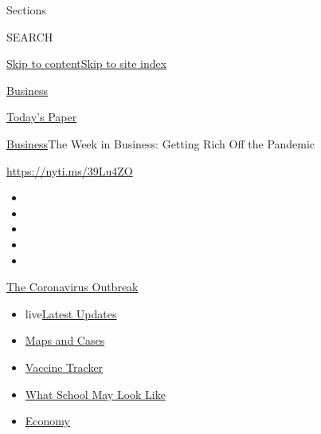 Sections

SEARCH

\protect\hyperlink{site-content}{Skip to
content}\protect\hyperlink{site-index}{Skip to site index}

\href{https://www.nytimes3xbfgragh.onion/section/business}{Business}

\href{https://myaccount.nytimes3xbfgragh.onion/auth/login?response_type=cookie\&client_id=vi}{}

\href{https://www.nytimes3xbfgragh.onion/section/todayspaper}{Today's
Paper}

\href{/section/business}{Business}\textbar{}The Week in Business:
Getting Rich Off the Pandemic

\url{https://nyti.ms/39Lu4ZO}

\begin{itemize}
\item
\item
\item
\item
\item
\end{itemize}

\href{https://www.nytimes3xbfgragh.onion/news-event/coronavirus?action=click\&pgtype=Article\&state=default\&region=TOP_BANNER\&context=storylines_menu}{The
Coronavirus Outbreak}

\begin{itemize}
\tightlist
\item
  live\href{https://www.nytimes3xbfgragh.onion/2020/08/02/world/coronavirus-updates.html?action=click\&pgtype=Article\&state=default\&region=TOP_BANNER\&context=storylines_menu}{Latest
  Updates}
\item
  \href{https://www.nytimes3xbfgragh.onion/interactive/2020/us/coronavirus-us-cases.html?action=click\&pgtype=Article\&state=default\&region=TOP_BANNER\&context=storylines_menu}{Maps
  and Cases}
\item
  \href{https://www.nytimes3xbfgragh.onion/interactive/2020/science/coronavirus-vaccine-tracker.html?action=click\&pgtype=Article\&state=default\&region=TOP_BANNER\&context=storylines_menu}{Vaccine
  Tracker}
\item
  \href{https://www.nytimes3xbfgragh.onion/interactive/2020/07/29/us/schools-reopening-coronavirus.html?action=click\&pgtype=Article\&state=default\&region=TOP_BANNER\&context=storylines_menu}{What
  School May Look Like}
\item
  \href{https://www.nytimes3xbfgragh.onion/live/2020/07/31/business/stock-market-today-coronavirus?action=click\&pgtype=Article\&state=default\&region=TOP_BANNER\&context=storylines_menu}{Economy}
\end{itemize}

